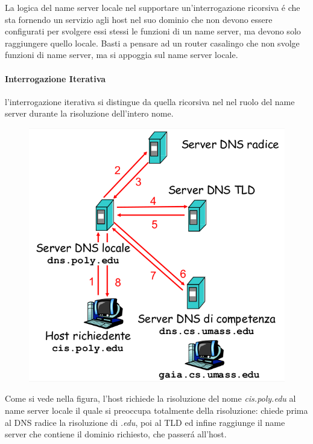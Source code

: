 \documentclass[12pt]{article}
\begin{document}
La logica del name server locale nel supportare un'interrogazione ricorsiva \'e che sta fornendo un servizio agli host nel suo 
dominio che non devono essere configurati per svolgere essi stessi le funzioni di un name server, ma devono solo raggiungere 
quello locale. Basti a pensare ad un router casalingo che non svolge funzioni di name server, ma si appoggia sul name server 
locale.

\clearpage
\paragraph{Interrogazione Iterativa} l'interrogazione iterativa si distingue da quella ricorsiva nel nel ruolo del name server 
durante la risoluzione dell'intero nome.
\begin{figure}
  \begin{center}
    \includegraphics[scale=0.3]{applicazione-img6.png}
  \end{center}
\end{figure}
Come si vede nella figura, l'host richiede la risoluzione del nome \textit{cis.poly.edu} al name server locale il quale si 
preoccupa totalmente della risoluzione: chiede prima al DNS radice la risoluzione di \textit{.edu}, poi al TLD ed infine 
raggiunge il name server che contiene il dominio richiesto, che passer\'a all'host.
\end{document}
